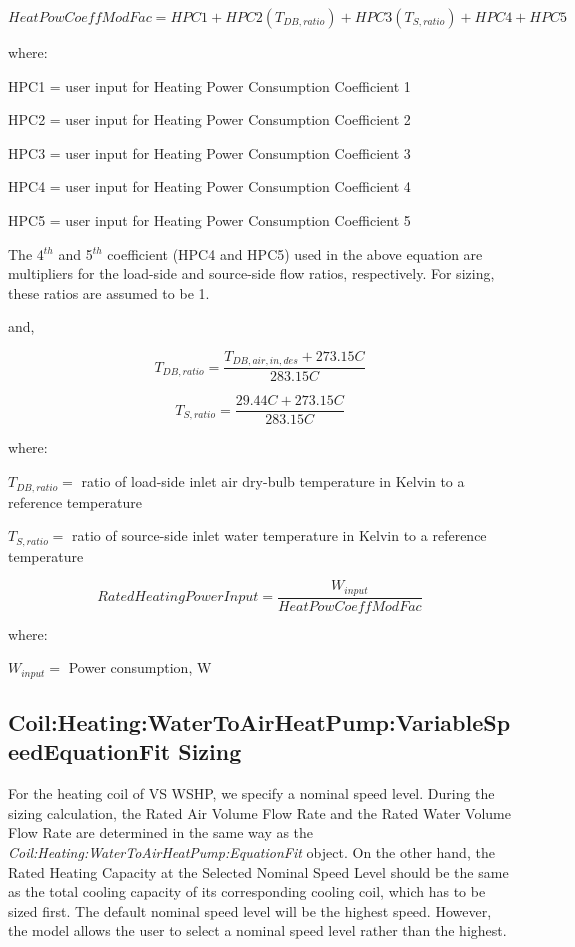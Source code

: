 \begin{equation}
	HeatPowCoeffModFac = HPC1 + HPC2 (T_{DB,ratio})+HPC3(T_{S,ratio})+HPC4+HPC5
\end{equation}

where:

HPC1 = user input for Heating Power Consumption Coefficient 1

HPC2 = user input for Heating Power Consumption Coefficient 2

HPC3 = user input for Heating Power Consumption Coefficient 3

HPC4 = user input for Heating Power Consumption Coefficient 4

HPC5 = user input for Heating Power Consumption Coefficient 5


The 4\(^{th}\) and 5\(^{th}\) coefficient (HPC4 and HPC5) used in the above equation are multipliers for the load-side and source-side flow ratios, respectively. For sizing, these ratios are assumed to be 1.

and, 

\begin{equation}
  T_{DB,ratio} = \frac{T_{DB,air,in,des}+273.15C}{283.15C}
\end{equation}

\begin{equation}
  T_{S,ratio} = \frac{29.44C+273.15C}{283.15C}
\end{equation}

where:
 
$T_{DB,ratio} = $ ratio of load-side inlet air dry-bulb temperature in Kelvin to a reference temperature

$T_{S,ratio} = $ ratio of source-side inlet water temperature in Kelvin to a reference temperature

\begin{equation}
   {Rated Heating Power Input} = \frac{{W}_{input}}{HeatPowCoeffModFac} 
\end{equation}

where:

${W}_{input} =$ Power consumption, \si{W}

\subsection{Coil:Heating:WaterToAirHeatPump:VariableSpeedEquationFit Sizing}\label{coilheatingwatertoairheatpumpvariablespeedequationfit-sizing}

For the heating coil of VS WSHP, we specify a nominal speed level. During the sizing calculation, the Rated Air Volume Flow Rate and the Rated Water Volume Flow Rate are determined in the same way as the \emph{Coil:Heating:WaterToAirHeatPump:EquationFit} object. On the other hand, the Rated Heating Capacity at the Selected Nominal Speed Level should be the same as the total cooling capacity of its corresponding cooling coil, which has to be sized first. The default nominal speed level will be the highest speed. However, the model allows the user to select a nominal speed level rather than the highest.

